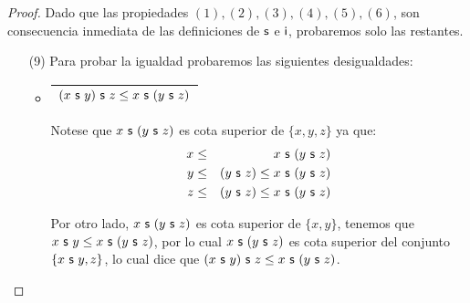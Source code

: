   \begin{proof}
    \PN Dado que las propiedades $(1), (2), (3), (4), (5), (6)$, son consecuencia inmediata de las definiciones de $\mathsf{s}$
    e $\mathsf{i}$, probaremos solo las restantes.
    \begin{enumerate}

      \item[(9)] Para probar la igualdad probaremos las siguientes desigualdades:
        \begin{itemize}
          \item \begin{tabular}{|c|} \hline $(x \ \mathsf{s} \ y) \ \mathsf{s} \ z \leq x \ \mathsf{s} \ (y \ \mathsf{s} \ z)$\\\hline \end{tabular}
            \PN Notese que $x \ \SU \ (y \ \SU \ z)$ es cota superior de $\{x, y, z\}$ ya que:
            \begin{eqnarray*}
              x &\leq& x \ \SU \ (y \ \SU \ z) \\
              y &\leq& (y \ \SU \ z) \leq x \ \SU \ (y \ \SU \ z) \\
              z &\leq& (y \ \SU \ z) \leq x \ \SU \ (y \ \SU \ z)
            \end{eqnarray*}

            \PN Por otro lado, $x \ \SU \ (y \ \SU \ z)$ es cota superior de $\{x, y\}$, tenemos que $x \ \mathsf{s} \ y \leq x
            \ \mathsf{s} \ (y \ \mathsf{s} \ z)$, por lo cual $x \ \SU \ (y \ \SU \ z)$ es cota superior del conjunto $\{x \ \mathsf{s} \ y,
            z\}$, lo cual dice que $(x \ \mathsf{s} \ y) \ \mathsf{s} \ z \leq x \ \mathsf{s} \ (y \ \mathsf{s} \ z)$.


\end{itemize}
\end{enumerate}
\end{proof}
